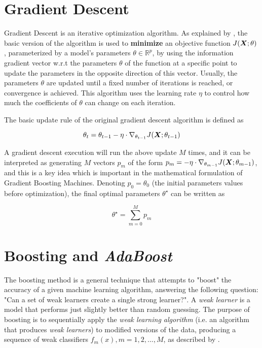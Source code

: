 \section{Gradient Descent}
\label{Gradient Descent}

Gradient Descent is an iterative optimization algorithm. As explained by \cite{Ruder2016AnOO}, the basic version of the algorithm is used to \textbf{minimize} an objective function $J(\bm{X};\theta)$, parameterized by a model's parameters $\theta \in \mathbb{R}^p$, by using the information gradient vector w.r.t the parameters $\theta$ of the function at a specific point to update the parameters in the opposite direction of this vector. Usually, the parameters $\theta$ are updated until a fixed number of iterations is reached, or convergence is achieved. This algorithm uses the learning rate $\eta$ to control how much the coefficients of $\theta$ can change on each iteration.

The basic update rule of the original gradient descent algorithm is defined as

\begin{equation}\label{eq:gradientDescent-update}
    \theta_t = \theta_{t-1} - \eta \cdot \nabla_{\theta_{t-1}} J(\bm{X};\theta_{t-1})  
\end{equation}

A gradient descent execution will run the above update $M$ times, and it can be interpreted as generating $M$ vectors $p_m$ of the form $p_m = -\eta\cdot\nabla_{\theta_{m-1}}J(\bm{X};\theta_{m-1})$, and  this is a key idea which is important in the mathematical formulation of Gradient Boosting Machines. 
Denoting $p_0 = \theta_0$ (the initial parameters values before optimization), the final optimal parameters $\theta^\star$ can be written as

\begin{equation}\label{eq:gradientDescent-params}
    \theta^\star = \sum_{m=0}^{M}p_m
\end{equation}

\section{Boosting and \textit{AdaBoost}}

The boosting method is a general technique that attempts to "boost" the accuracy of a given machine learning algorithm, answering the following question: "Can a set of weak learners create a single strong learner?". A \textit{weak learner} is a model that performs just slightly better than random guessing. The purpose of boosting is to sequentially apply the \textit{weak learning algorithm} (i.e. an algorithm that produces \textit{weak learners}) to modified versions of the data, producing a sequence of weak classifiers $f_m(x), m = 1, 2, ..., M$, as described by \cite{hastie2009elements}. 

